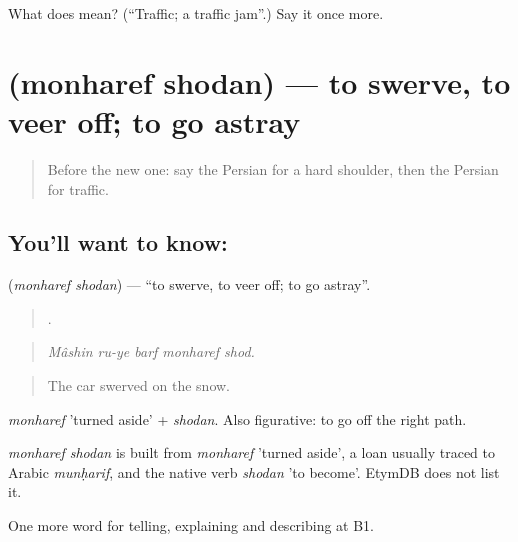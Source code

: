 \begin{tcolorbox}[breakable,colback=teal!4,colframe=teal!35!black,title={Before you move on}]
What does  mean? (\textquotedblleft{}Traffic; a traffic jam\textquotedblright{}.) Say it once more.
\end{tcolorbox}
\section[\texorpdfstring{\fa{منحرف} \fa{شدن} (monharef shodan)}{منحرف شدن (monharef shodan)}]{  (monharef shodan) — to swerve, to veer off; to go astray}

\label{lesson:FA-C425-monharef-shodan}



\begin{quote}
Before the new one: say the Persian for a hard shoulder, then the Persian for traffic.
\end{quote}

\subsection*{You'll want to know:  }
\textbf{ } (\emph{monharef shodan}) — \textquotedblleft{}to swerve, to veer off; to go astray\textquotedblright{}.

\begin{quote}
    .
\end{quote}

\begin{quote}
\emph{Mâshin ru-ye barf monharef shod.}
\end{quote}

\begin{quote}
The car swerved on the snow.
\end{quote}

\emph{monharef} 'turned aside' + \emph{shodan}. Also figurative: to go off the right path.

\begin{cousinweb}
\emph{monharef shodan} is built from \emph{monharef} 'turned aside', a loan usually traced to Arabic \emph{munḥarif}, and the native verb \emph{shodan} 'to become'. EtymDB does not list it.
\end{cousinweb}

\begin{grammarlens}[title={What you've built}]
One more word for telling, explaining and describing at B1.
\end{grammarlens}

